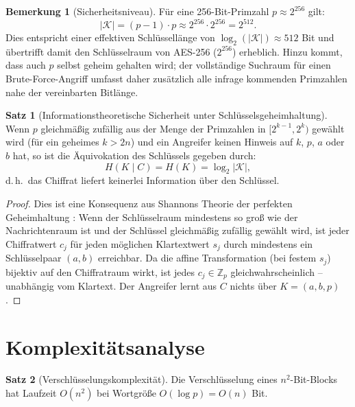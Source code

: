 ﻿\documentclass[a4paper,12pt]{scrreprt}
\theoremstyle{definition}
\newtheorem{bemerkung}{Bemerkung}[section]
\newtheorem{satz}{Satz}[section]
\begin{document}
\begin{bemerkung}[Sicherheitsniveau]
	Für eine 256-Bit-Primzahl $p \approx 2^{256}$ gilt:
	\[
	|\mathcal{K}| = (p-1) \cdot p \approx 2^{256} \cdot 2^{256} = 2^{512}.
	\]
	Dies entspricht einer effektiven Schlüssellänge von $\log_2(|\mathcal{K}|) \approx 512$ Bit und übertrifft damit den Schlüsselraum von AES-256 ($2^{256}$) erheblich. Hinzu kommt, dass auch $p$ selbst geheim gehalten wird; der vollständige Suchraum für einen Brute-Force-Angriff umfasst daher zusätzlich alle infrage kommenden Primzahlen nahe der vereinbarten Bitlänge.
\end{bemerkung}

\begin{satz}[Informationstheoretische Sicherheit unter Schlüsselsgeheimhaltung]
	\label{satz:infotheorie}
	Wenn $p$ gleichmäßig zufällig aus der Menge der Primzahlen in $[2^{k-1}, 2^k)$ gewählt wird (für ein geheimes $k > 2n$) und ein Angreifer keinen Hinweis auf $k$, $p$, $a$ oder $b$ hat, so ist die Äquivokation des Schlüssels gegeben durch:
	\[
	H(K \mid C) = H(K) = \log_2 |\mathcal{K}|,
	\]
	d.\,h.\ das Chiffrat liefert keinerlei Information über den Schlüssel.
\end{satz}

\begin{proof}
	Dies ist eine Konsequenz aus Shannons Theorie der perfekten Geheimhaltung \cite{Sha49}: Wenn der Schlüsselraum mindestens so groß wie der Nachrichtenraum ist und der Schlüssel gleichmäßig zufällig gewählt wird, ist jeder Chiffratwert $c_j$ für jeden möglichen Klartextwert $s_j$ durch mindestens ein Schlüsselpaar $(a, b)$ erreichbar. Da die affine Transformation (bei festem $s_j$) bijektiv auf den Chiffratraum wirkt, ist jedes $c_j \in \mathbb{Z}_p$ gleichwahrscheinlich -- unabhängig vom Klartext. Der Angreifer lernt aus $C$ nichts über $K = (a, b, p)$.
\end{proof}

\section{Komplexitätsanalyse}

\begin{satz}[Verschlüsselungskomplexität]
	\label{satz:enc-kompl}
	Die Verschlüsselung eines $n^2$-Bit-Blocks hat Laufzeit $O(n^2)$ bei Wortgröße $O(\log p) = O(n)$ Bit.
\end{satz}
\end{document}
